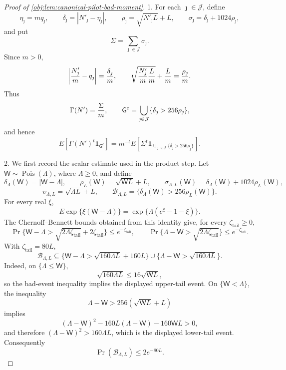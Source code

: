 \begin{proof}[Proof of \cref{obj:lem:canonical-pilot-bad-moment}]
1.  For each \(\jmath\in\mathcal J\), define
\[
\eta_\jmath=mq_\jmath,\qquad
\delta_\jmath=\left|N'_\jmath-\eta_\jmath\right|,
\qquad
\rho_\jmath=\sqrt{N'_\jmath L}+L,
\qquad
\sigma_\jmath=\delta_\jmath+1024\rho_\jmath,
\]
and put
\[
\Sigma=\sum_{\jmath\in\mathcal J}\sigma_\jmath .
\]
Since \(m>0\),
\[
\left|{N'_\jmath\over m}-q_\jmath\right|
={\delta_\jmath\over m},
\qquad
\sqrt{{N'_\jmath\over m}{L\over m}}+{L\over m}
={\rho_\jmath\over m}.
\]
Thus
\[
\Gamma(N')={\Sigma\over m},
\qquad
\mathsf G^c
=
\bigcup_{\jmath\in\mathcal J}
\{\delta_\jmath>256\rho_\jmath\},
\]
and hence
\[
E\!\left[\Gamma(N')^t\mathbf 1_{\mathsf G^c}\right]
=
m^{-t}
E\!\left[
\Sigma^t
\mathbf 1_{\cup_{\jmath\in\mathcal J}\{\delta_\jmath>256\rho_\jmath\}}
\right].
\]

2.  We first record the scalar estimate used in the product step.  Let
\(\mathsf W\sim\operatorname{Pois}(\Lambda)\), where \(\Lambda\ge0\), and define
\[
\delta_{\Lambda}(\mathsf W)=|\mathsf W-\Lambda|,
\qquad
\rho_L(\mathsf W)=\sqrt{\mathsf W L}+L,
\qquad
\sigma_{\Lambda,L}(\mathsf W)
=
\delta_{\Lambda}(\mathsf W)+1024\rho_L(\mathsf W),
\]
\[
\upsilon_{\Lambda,L}=\sqrt{\Lambda L}+L,
\qquad
\mathcal B_{\Lambda,L}
=
\{\delta_{\Lambda}(\mathsf W)>256\rho_L(\mathsf W)\}.
\]
For every real \(\xi\),
\[
E\exp\{\xi(\mathsf W-\Lambda)\}
=
\exp\{\Lambda(e^\xi-1-\xi)\}.
\]
The Chernoff--Bennett bounds obtained from this identity give, for every
\(\zeta_{\mathrm{tail}}\ge0\),
\[
\Pr\{\mathsf W-\Lambda>\sqrt{2\Lambda\zeta_{\mathrm{tail}}}
       +2\zeta_{\mathrm{tail}}\}\le e^{-\zeta_{\mathrm{tail}}},
\qquad
\Pr\{\Lambda-\mathsf W>\sqrt{2\Lambda\zeta_{\mathrm{tail}}}\}
\le e^{-\zeta_{\mathrm{tail}}}.
\]
With \(\zeta_{\mathrm{tail}}=80L\),
\[
\mathcal B_{\Lambda,L}
\subseteq
\{\mathsf W-\Lambda>\sqrt{160\Lambda L}+160L\}
\cup
\{\Lambda-\mathsf W>\sqrt{160\Lambda L}\}.
\]
Indeed, on \(\{\Lambda\le\mathsf W\}\),
\[
\sqrt{160\Lambda L}\le16\sqrt{\mathsf W L},
\]
so the bad-event inequality implies the displayed upper-tail event.  On
\(\{\mathsf W<\Lambda\}\), the inequality
\[
\Lambda-\mathsf W>256(\sqrt{\mathsf W L}+L)
\]
implies
\[
(\Lambda-\mathsf W)^2-160L(\Lambda-\mathsf W)-160\mathsf W L>0,
\]
and therefore \((\Lambda-\mathsf W)^2>160\Lambda L\), which is the displayed
lower-tail event.  Consequently
\[
\Pr(\mathcal B_{\Lambda,L})\le 2e^{-80L}.
\]


\end{proof}
